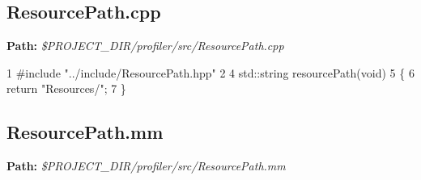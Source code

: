  \hypertarget{_benchmark_program_BenchmarkProgramResourcePath_cpp}{}\subsection{Resource\+Path.\+cpp}\label{_benchmark_program_BenchmarkProgramResourcePath_cpp}
{\bfseries Path\+:} {\itshape \$\+P\+R\+O\+J\+E\+C\+T\+\_\+\+D\+I\+R/profiler/src/\+Resource\+Path.cpp} 
\begin{DoxyCodeInclude}
1 \textcolor{preprocessor}{#include "../include/ResourcePath.hpp"}
2 
4 std::string resourcePath(\textcolor{keywordtype}{void})
5 \{
6     \textcolor{keywordflow}{return} \textcolor{stringliteral}{"Resources/"};
7 \}
\end{DoxyCodeInclude}
 \hypertarget{_benchmark_program_BenchmarkProgramResourcePath_mm}{}\subsection{Resource\+Path.\+mm}\label{_benchmark_program_BenchmarkProgramResourcePath_mm}
{\bfseries Path\+:} {\itshape \$\+P\+R\+O\+J\+E\+C\+T\+\_\+\+D\+I\+R/profiler/src/\+Resource\+Path.mm} 
